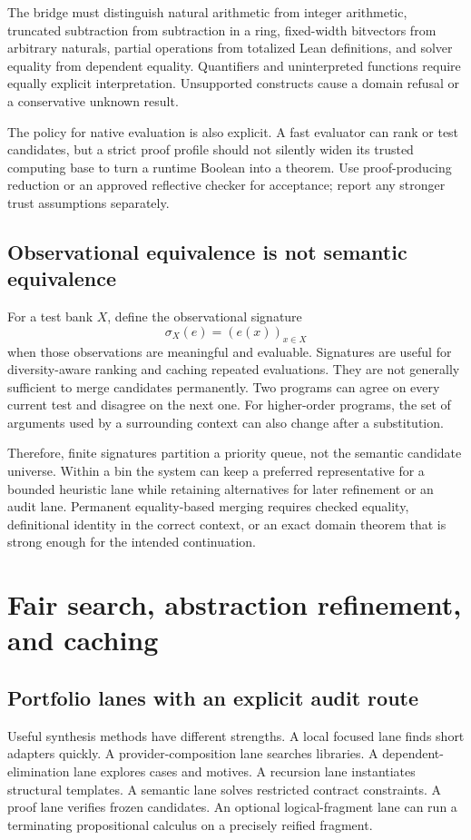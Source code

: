 The bridge must distinguish natural arithmetic from integer arithmetic, truncated subtraction from subtraction in a ring, fixed-width bitvectors from arbitrary naturals, partial operations from totalized Lean definitions, and solver equality from dependent equality. Quantifiers and uninterpreted functions require equally explicit interpretation. Unsupported constructs cause a domain refusal or a conservative unknown result.

The policy for native evaluation is also explicit. A fast evaluator can rank or test candidates, but a strict proof profile should not silently widen its trusted computing base to turn a runtime Boolean into a theorem. Use proof-producing reduction or an approved reflective checker for acceptance; report any stronger trust assumptions separately.

\subsection{Observational equivalence is not semantic equivalence}
For a test bank $X$, define the observational signature
\[
 \sigma_X(e)=(e(x))_{x\in X}
\]
when those observations are meaningful and evaluable. Signatures are useful for diversity-aware ranking and caching repeated evaluations. They are not generally sufficient to merge candidates permanently. Two programs can agree on every current test and disagree on the next one. For higher-order programs, the set of arguments used by a surrounding context can also change after a substitution.

Therefore, finite signatures partition a priority queue, not the semantic candidate universe. Within a bin the system can keep a preferred representative for a bounded heuristic lane while retaining alternatives for later refinement or an audit lane. Permanent equality-based merging requires checked equality, definitional identity in the correct context, or an exact domain theorem that is strong enough for the intended continuation.

\section{Fair search, abstraction refinement, and caching}
\label{sec:scheduling}
\subsection{Portfolio lanes with an explicit audit route}
Useful synthesis methods have different strengths. A local focused lane finds short adapters quickly. A provider-composition lane searches libraries. A dependent-elimination lane explores cases and motives. A recursion lane instantiates structural templates. A semantic lane solves restricted contract constraints. A proof lane verifies frozen candidates. An optional logical-fragment lane can run a terminating propositional calculus on a precisely reified fragment.

